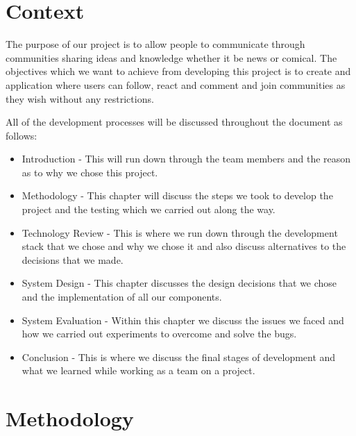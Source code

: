 \chapter{Context}
The purpose of our project is to allow people to communicate through communities sharing ideas and knowledge whether it be news or comical. The objectives which we want to achieve from developing this project is to create and application where users can follow, react and comment and join communities as they wish without any restrictions.

All of the development processes will be discussed throughout the document as follows:

\begin{itemize}
\item Introduction - This will run down through the team members and the reason as to why we chose this project.

\item Methodology - This chapter will discuss the steps we took to develop the project and the testing which we carried out along the way.

\item Technology Review - This is where we run down through the development stack that we chose and why we chose it and also discuss alternatives to the decisions that we made. 

\item System Design - This chapter discusses the design decisions that we chose and the implementation of all our components.

\item System Evaluation - Within this chapter we discuss the issues we faced and how we carried out experiments to overcome and solve the bugs.

\item Conclusion - This is where we discuss the final stages of development and what we learned while working as a team on a project.
\end{itemize}

\chapter{Methodology}

